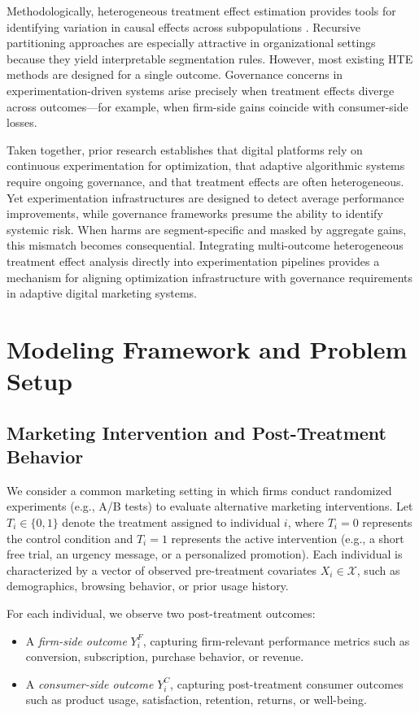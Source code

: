 \documentclass[11pt,letterpaper,english]{article}
\theoremstyle{definition}
\theoremstyle{definition}
\begin{document}
\begin{bibunit}
Methodologically, heterogeneous treatment effect estimation provides tools for 
identifying variation in causal effects across subpopulations 
\citep{athey2016recursive, wager2018estimation, athey2019grf}. Recursive 
partitioning approaches are especially attractive in organizational settings 
because they yield interpretable segmentation rules. However, most existing 
HTE methods are designed for a single outcome. Governance concerns in 
experimentation-driven systems arise precisely when treatment effects diverge 
across outcomes—for example, when firm-side gains coincide with consumer-side 
losses.

Taken together, prior research establishes that digital platforms rely on 
continuous experimentation for optimization, that adaptive algorithmic systems 
require ongoing governance, and that treatment effects are often heterogeneous. 
Yet experimentation infrastructures are designed to detect average performance 
improvements, while governance frameworks presume the ability to identify systemic 
risk. When harms are segment-specific and masked by aggregate gains, this mismatch 
becomes consequential. Integrating multi-outcome heterogeneous treatment effect 
analysis directly into experimentation pipelines provides a mechanism for aligning 
optimization infrastructure with governance requirements in adaptive digital 
marketing systems.

\section{Modeling Framework and Problem Setup}
\label{sec:app}

\subsection{Marketing Intervention and Post-Treatment Behavior}

We consider a common marketing setting in which firms conduct randomized experiments (e.g., A/B tests) to evaluate alternative marketing interventions. Let $T_i \in \{0,1\}$ denote the treatment assigned to individual $i$, where $T_i=0$ represents the control condition and $T_i=1$ represents the active intervention (e.g., a short free trial, an urgency message, or a personalized promotion). Each individual is characterized by a vector of observed pre-treatment covariates $X_i \in \mathcal{X}$, such as demographics, browsing behavior, or prior usage history.

For each individual, we observe two post-treatment outcomes:
\begin{itemize}
    \item A \emph{firm-side outcome} $Y_i^F$, capturing firm-relevant performance metrics such as conversion, subscription, purchase behavior, or revenue.
    \item A \emph{consumer-side outcome} $Y_i^C$, capturing post-treatment consumer outcomes such as product usage, satisfaction, retention, returns, or well-being.
\end{itemize}


\end{bibunit}
\end{document}
